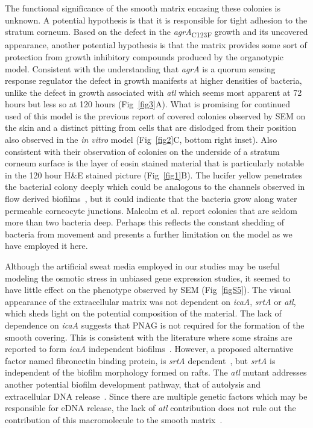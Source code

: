 \documentclass[10pt,letterpaper]{article}
\begin{document}
The functional significance of the smooth matrix encasing these colonies is unknown.
A potential hypothesis is that it is responsible for tight adhesion to the stratum corneum.
Based on the defect in the \textit{agrA}\textsubscript{C123F} growth and its uncovered appearance,  another potential hypothesis is that the matrix provides some sort of protection from growth inhibitory compounds produced by the organotypic model.
Consistent with the understanding that \textit{agrA} is a quorum sensing response regulator the defect in growth manifests at higher densities of bacteria, unlike the defect in growth associated with \textit{atl} which seems most apparent at 72 hours but less so at 120 hours (Fig~\ref{fig3}A).
What is promising for continued used of this model is the previous report of covered colonies observed by SEM on the skin and a distinct pitting from cells that are dislodged from their position~\cite{malcolm_demonstration_1980} also observed in the \textit{in vitro} model (Fig~\ref{fig2}C, bottom right inset).
Also consistent with their observation of colonies on the underside of a stratum corneum surface is the layer of eosin stained material that is particularly notable in the 120 hour H\&E stained picture (Fig~\ref{fig1}B).
The lucifer yellow penetrates the bacterial colony deeply which could be analogous to the channels observed in flow derived biofilms~\cite{periasamy_how_2012}, but it could indicate that the bacteria grow along water permeable corneocyte junctions.
Malcolm et al. report colonies that are seldom more than two bacteria deep.
Perhaps this reflects the constant shedding of bacteria from movement and presents a further limitation on the model as we have employed it here.

Although the artificial sweat media employed in our studies may be useful modeling the osmotic stress in unbiased gene expression studies, it seemed to have little effect on the phenotype observed by SEM (Fig~\ref{figS5}).
The visual appearance of the extracellular matrix was not dependent on \textit{icaA}, \textit{srtA} or \textit{atl}, which sheds light on the potential composition of the material.
The lack of dependence on \textit{icaA} suggests that PNAG is not required for the formation of the smooth covering.
This is consistent with the literature where some strains are reported to form \textit{icaA} independent biofilms~\cite{fitzpatrick_evidence_2005}.
However, a proposed alternative factor named fibronectin binding protein, is \textit{srtA} dependent~\cite{oneill_novel_2008}, but \textit{srtA} is independent of the biofilm morphology formed on rafts.
The \textit{atl} mutant addresses another potential biofilm development pathway, that of autolysis and extracellular DNA release~\cite{bose_contribution_2012}.
Since there are multiple genetic factors which may be responsible for eDNA release, the lack of \textit{atl} contribution does not rule out the contribution of this macromolecule to the smooth matrix~\cite{ranjit_staphylococcus_2011}.
\end{document}
